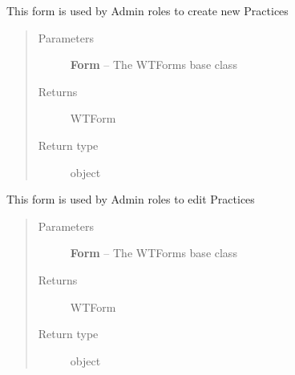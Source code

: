 \documentclass[letterpaper,10pt,english]{sphinxmanual}
\begin{document}
\begin{fulllineitems}
\label{dev-practices:cagenix.practices.forms.PracticeCreateForm}
This form is used by Admin roles to create new Practices
\begin{quote}\begin{description}
\item[{Parameters}] \leavevmode
\textbf{Form} -- The WTForms base class

\item[{Returns}] \leavevmode
WTForm

\item[{Return type}] \leavevmode
object

\end{description}\end{quote}

\end{fulllineitems}


\begin{fulllineitems}
\label{dev-practices:cagenix.practices.forms.PracticeEditForm}
This form is used by Admin roles to edit Practices
\begin{quote}\begin{description}
\item[{Parameters}] \leavevmode
\textbf{Form} -- The WTForms base class

\item[{Returns}] \leavevmode
WTForm

\item[{Return type}] \leavevmode
object

\end{description}\end{quote}

\end{fulllineitems}
\end{document}
